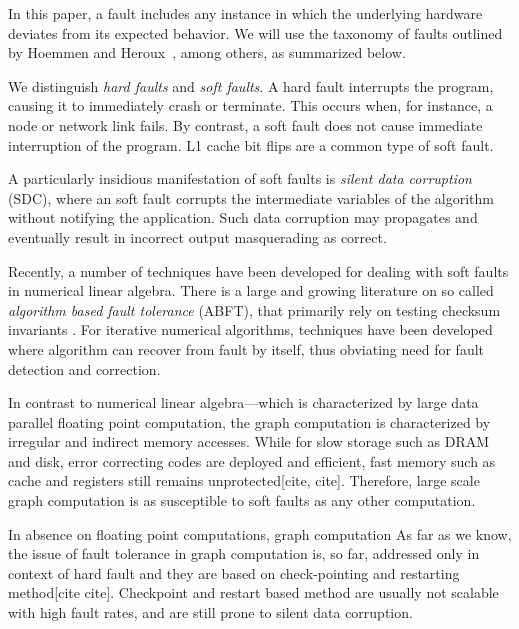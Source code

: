 


In this paper, a fault includes any instance in which the underlying
hardware deviates from its expected behavior.
We will use the taxonomy of faults outlined by Hoemmen and Heroux~\cite{hoemmen2011reliability}, 
among others, as summarized below.

%
We distinguish \emph{hard faults} and \emph{soft faults}. A hard fault interrupts the program, 
causing it to immediately crash or terminate. This occurs when, for instance, a node or network 
link fails. By contrast, a soft fault does not cause immediate interruption of the program. L1 cache 
bit flips
are a common type of soft fault. 

A particularly insidious manifestation of soft faults is \emph{silent data corruption} (SDC), where 
an soft fault corrupts the intermediate variables of the algorithm without notifying the
application. Such data corruption may propagates and eventually result in incorrect output
masquerading as correct. 

Recently, a number of techniques have been developed for dealing with soft faults in numerical
linear algebra. There is a large and growing literature on so called
\emph{algorithm based fault tolerance} (ABFT), that primarily rely on testing checksum invariants
\cite{huang1984abft,luk1988abft,du2012abft,shantharam2012ftcg}. 
For iterative numerical algorithms, techniques have been developed where 
algorithm can recover from fault by itself, thus obviating need for fault detection and
correction\cite{hoemmen2011reliability,sao2013sscg, elliott2016exploiting}. 
% 

In contrast to numerical linear algebra---which is characterized by large data parallel floating point 
computation,  the graph computation is characterized by irregular and indirect memory accesses.
While for slow storage
such as DRAM and disk, error correcting codes are deployed and efficient, fast memory 
such as cache and registers still remains unprotected[cite, cite]. Therefore, large scale graph computation is
as susceptible to soft faults as any other computation. 

In absence on floating point computations, graph computation 
As far as we know, the issue of fault tolerance 
in graph computation is, so far, addressed only in context of hard fault and they are based on 
check-pointing and restarting method[cite cite]. Checkpoint and restart based method are usually not 
scalable with high fault rates, and are still prone to silent data corruption.  
%


